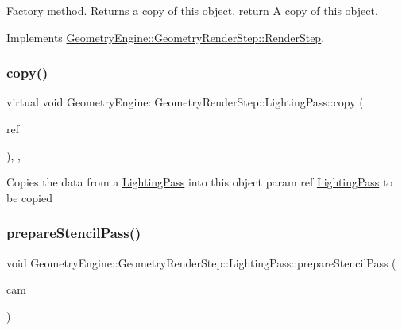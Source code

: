 Factory method. Returns a copy of this object. return A copy of this object. 

Implements \mbox{\hyperlink{class_geometry_engine_1_1_geometry_render_step_1_1_render_step_afe33ea9d82c5be11f55af7d39691d44b}{Geometry\+Engine\+::\+Geometry\+Render\+Step\+::\+Render\+Step}}.

\mbox{\label{class_geometry_engine_1_1_geometry_render_step_1_1_lighting_pass_a4865616b03a872033a6f9abc5c370374}} 
\subsubsection{\texorpdfstring{copy()}{copy()}}
{\footnotesize\ttfamily virtual void Geometry\+Engine\+::\+Geometry\+Render\+Step\+::\+Lighting\+Pass\+::copy (\begin{DoxyParamCaption}\item[{const \mbox{\hyperlink{class_geometry_engine_1_1_geometry_render_step_1_1_lighting_pass}{Lighting\+Pass}} \&}]{ref }\end{DoxyParamCaption})\hspace{0.3cm}{\ttfamily [inline]}, {\ttfamily [protected]}, {\ttfamily [virtual]}}

Copies the data from a \mbox{\hyperlink{class_geometry_engine_1_1_geometry_render_step_1_1_lighting_pass}{Lighting\+Pass}} into this object param ref \mbox{\hyperlink{class_geometry_engine_1_1_geometry_render_step_1_1_lighting_pass}{Lighting\+Pass}} to be copied \mbox{\label{class_geometry_engine_1_1_geometry_render_step_1_1_lighting_pass_a1a3280c28b0750c7cad03f01d37374c7}} 
\subsubsection{\texorpdfstring{prepareStencilPass()}{prepareStencilPass()}}
{\footnotesize\ttfamily void Geometry\+Engine\+::\+Geometry\+Render\+Step\+::\+Lighting\+Pass\+::prepare\+Stencil\+Pass (\begin{DoxyParamCaption}\item[{\mbox{\hyperlink{class_geometry_engine_1_1_geometry_world_item_1_1_geometry_camera_1_1_camera}{Geometry\+World\+Item\+::\+Geometry\+Camera\+::\+Camera}} $\ast$}]{cam }\end{DoxyParamCaption})\hspace{0.3cm}{\ttfamily [protected]}}

